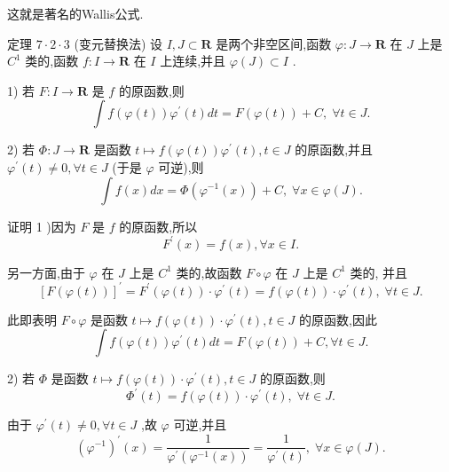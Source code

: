 这就是著名的Wallis公式.

定理 $7 \cdot  2 \cdot  3$ (变元替换法) 设 $I,J \subset  \mathbf{R}$ 是两个非空区间,函数 $\varphi  : J \rightarrow  \mathbf{R}$ 在 $J$ 上是 ${C}^{1}$ 类的,函数 $f : I \rightarrow  \mathbf{R}$ 在 $I$ 上连续,并且 $\varphi \left( J\right)  \subset  I$ .

1) 若 $F : I \rightarrow  \mathbf{R}$ 是 $f$ 的原函数,则
$$\int f\left( {\varphi \left( t\right) }\right) {\varphi }^{\prime }\left( t\right) {dt} = F\left( {\varphi \left( t\right) }\right)  + C,\;\forall t \in  J.$$

2) 若 $\Phi  : J \rightarrow  \mathbf{R}$ 是函数 $t \mapsto  f\left( {\varphi \left( t\right) }\right) {\varphi }^{\prime }\left( t\right) ,t \in  J$ 的原函数,并且 ${\varphi }^{\prime }\left( t\right)  \neq  0,\forall t \in  J$ (于是 $\varphi$ 可逆),则
$$\int f\left( x\right) {dx} = \Phi \left( {{\varphi }^{-1}\left( x\right) }\right)  + C,\;\forall x \in  \varphi \left( J\right) .$$

证明 1 )因为 $F$ 是 $f$ 的原函数,所以
$${F}^{\prime }\left( x\right)  = f\left( x\right) ,\forall x \in  I.$$

另一方面,由于 $\varphi$ 在 $J$ 上是 ${C}^{1}$ 类的,故函数 $F \circ  \varphi$ 在 $J$ 上是 ${C}^{1}$ 类的, 并且
$${\left\lbrack  F\left( \varphi \left( t\right) \right) \right\rbrack  }^{\prime } = {F}^{\prime }\left( {\varphi \left( t\right) }\right)  \cdot  {\varphi }^{\prime }\left( t\right)  = f\left( {\varphi \left( t\right) }\right)  \cdot  {\varphi }^{\prime }\left( t\right) ,\;\forall t \in  J.$$

此即表明 $F \circ  \varphi$ 是函数 $t \mapsto  f\left( {\varphi \left( t\right) }\right)  \cdot  {\varphi }^{\prime }\left( t\right) ,t \in  J$ 的原函数,因此
$$\int f\left( {\varphi \left( t\right) }\right) {\varphi }^{\prime }\left( t\right) {dt} = F\left( {\varphi \left( t\right) }\right)  + C,\forall t \in  J.$$

2) 若 $\Phi$ 是函数 $t \mapsto  f\left( {\varphi \left( t\right) }\right)  \cdot  {\varphi }^{\prime }\left( t\right) ,t \in  J$ 的原函数,则
$${\Phi }^{\prime }\left( t\right)  = f\left( {\varphi \left( t\right) }\right)  \cdot  {\varphi }^{\prime }\left( t\right) ,\;\forall t \in  J.$$

由于 ${\varphi }^{\prime }\left( t\right)  \neq  0,\forall t \in  J$ ,故 $\varphi$ 可逆,并且
$${\left( {\varphi }^{-1}\right) }^{\prime }\left( x\right)  = \frac{1}{{\varphi }^{\prime }\left( {{\varphi }^{-1}\left( x\right) }\right) } = \frac{1}{{\varphi }^{\prime }\left( t\right) },\;\forall x \in  \varphi \left( J\right) .$$

